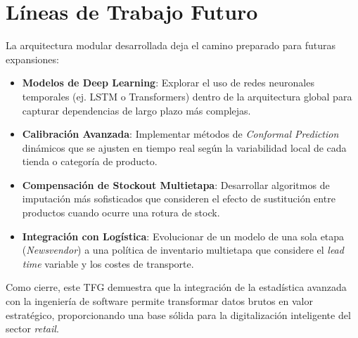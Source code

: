 \section{Líneas de Trabajo Futuro}
La arquitectura modular desarrollada deja el camino preparado para futuras expansiones:
\begin{itemize}
    \item \textbf{Modelos de Deep Learning}: Explorar el uso de redes neuronales temporales (ej. LSTM o Transformers) dentro de la arquitectura global para capturar dependencias de largo plazo más complejas.
    \item \textbf{Calibración Avanzada}: Implementar métodos de \textit{Conformal Prediction} dinámicos que se ajusten en tiempo real según la variabilidad local de cada tienda o categoría de producto.
    \item \textbf{Compensación de Stockout Multietapa}: Desarrollar algoritmos de imputación más sofisticados que consideren el efecto de sustitución entre productos cuando ocurre una rotura de stock.
    \item \textbf{Integración con Logística}: Evolucionar de un modelo de una sola etapa (\textit{Newsvendor}) a una política de inventario multietapa que considere el \textit{lead time} variable y los costes de transporte.
\end{itemize}

Como cierre, este TFG demuestra que la integración de la estadística avanzada con la ingeniería de software permite transformar datos brutos en valor estratégico, proporcionando una base sólida para la digitalización inteligente del sector \textit{retail}.
